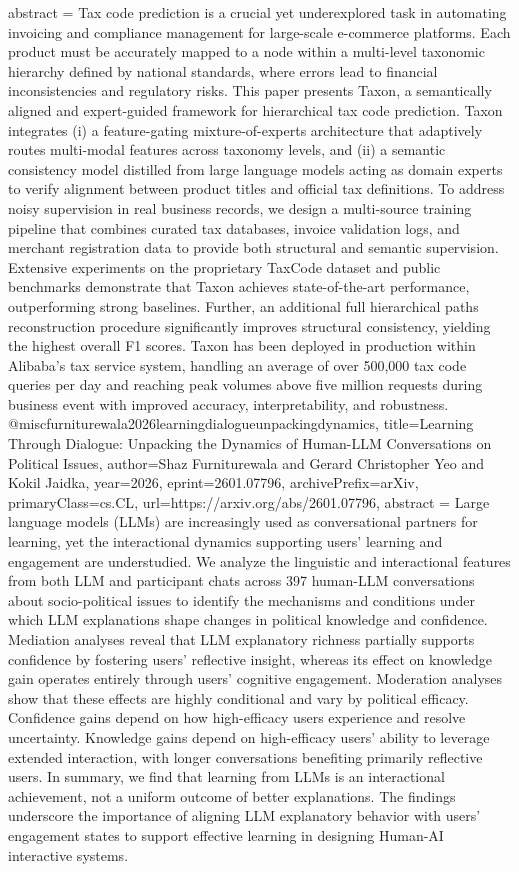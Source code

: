 {      abstract = {Tax code prediction is a crucial yet underexplored task in automating invoicing and compliance management for large-scale e-commerce platforms. Each product must be accurately mapped to a node within a multi-level taxonomic hierarchy defined by national standards, where errors lead to financial inconsistencies and regulatory risks. This paper presents Taxon, a semantically aligned and expert-guided framework for hierarchical tax code prediction. Taxon integrates (i) a feature-gating mixture-of-experts architecture that adaptively routes multi-modal features across taxonomy levels, and (ii) a semantic consistency model distilled from large language models acting as domain experts to verify alignment between product titles and official tax definitions. To address noisy supervision in real business records, we design a multi-source training pipeline that combines curated tax databases, invoice validation logs, and merchant registration data to provide both structural and semantic supervision. Extensive experiments on the proprietary TaxCode dataset and public benchmarks demonstrate that Taxon achieves state-of-the-art performance, outperforming strong baselines. Further, an additional full hierarchical paths reconstruction procedure significantly improves structural consistency, yielding the highest overall F1 scores. Taxon has been deployed in production within Alibaba's tax service system, handling an average of over 500,000 tax code queries per day and reaching peak volumes above five million requests during business event with improved accuracy, interpretability, and robustness.}
}@misc{furniturewala2026learningdialogueunpackingdynamics,
      title={Learning Through Dialogue: Unpacking the Dynamics of Human-LLM Conversations on Political Issues}, 
      author={Shaz Furniturewala and Gerard Christopher Yeo and Kokil Jaidka},
      year={2026},
      eprint={2601.07796},
      archivePrefix={arXiv},
      primaryClass={cs.CL},
      url={https://arxiv.org/abs/2601.07796},
      abstract = {Large language models (LLMs) are increasingly used as conversational partners for learning, yet the interactional dynamics supporting users' learning and engagement are understudied. We analyze the linguistic and interactional features from both LLM and participant chats across 397 human-LLM conversations about socio-political issues to identify the mechanisms and conditions under which LLM explanations shape changes in political knowledge and confidence. Mediation analyses reveal that LLM explanatory richness partially supports confidence by fostering users' reflective insight, whereas its effect on knowledge gain operates entirely through users' cognitive engagement. Moderation analyses show that these effects are highly conditional and vary by political efficacy. Confidence gains depend on how high-efficacy users experience and resolve uncertainty. Knowledge gains depend on high-efficacy users' ability to leverage extended interaction, with longer conversations benefiting primarily reflective users. In summary, we find that learning from LLMs is an interactional achievement, not a uniform outcome of better explanations. The findings underscore the importance of aligning LLM explanatory behavior with users' engagement states to support effective learning in designing Human-AI interactive systems.}
}
